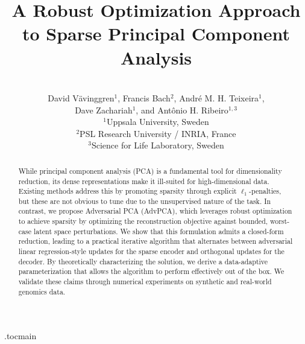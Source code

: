 \documentclass{article}
\title{A Robust Optimization Approach to Sparse Principal Component Analysis}
\author{\vspace{-0.8cm}\\David Vävinggren$^{1}$, Francis Bach$^{2}$,
  André M. H. Teixeira$^{1}$,\\ Dave Zachariah$^{1}$, and Antônio H. Ribeiro$^{1, 3}$\\[0.8em]
  \normalsize $^{1}$Uppsala University, Sweden\\
  \normalsize $^{2}$PSL Research University / INRIA, France\\
  \normalsize $^{3}$Science for Life Laboratory, Sweden
}
\begin{document}
\etocdepthtag.toc{main}
\maketitle

\vspace{-0.7cm}
\begin{abstract}

\noindent While principal component analysis (PCA) is a fundamental tool for dimensionality reduction, its dense representations make it ill-suited for high-dimensional data. Existing methods address this by promoting sparsity through explicit $\ell_1$-penalties, but these are not obvious to tune due to the unsupervised nature of the task. In contrast, we propose Adversarial PCA (AdvPCA), which leverages robust optimization to achieve sparsity by optimizing the reconstruction objective against bounded, worst-case latent space perturbations. We show that this formulation admits a closed-form reduction, leading to a practical iterative algorithm that alternates between adversarial linear regression-style updates for the sparse encoder and orthogonal updates for the decoder. By theoretically characterizing the solution, we derive a data-adaptive parameterization that allows the algorithm to perform effectively out of the box. We validate these claims through numerical experiments on synthetic and real-world genomics data.
\end{abstract}
\vspace{-0.2cm}
\end{document}
